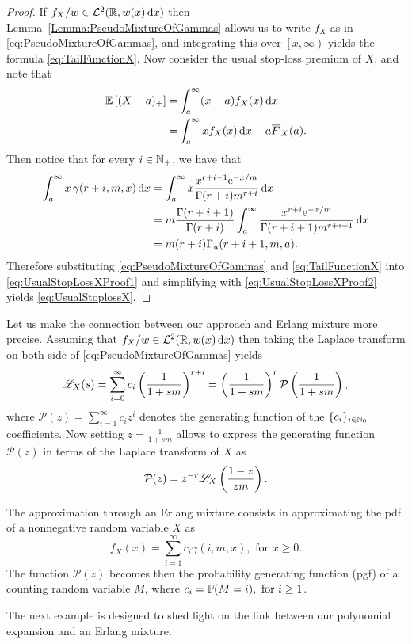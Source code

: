 \begin{proof}
If $f_{X}/w\in \mathcal{L}^2(\mathbb{R}, w(x) \mathop{}\!\mathrm{d} x)$ then Lemma~\ref{Lemma:PseudoMixtureOfGammas} allows us to write $f_X$ as in \eqref{eq:PseudoMixtureOfGammas}, and integrating this over $\left[x,\infty\right)$ yields the formula \eqref{eq:TailFunctionX}.
Now consider the usual stop-loss premium of $X$, and note that
\begin{align}
\Exp\left[(X-a)_+\right]=&\int_{a}^{\infty}(x-a)f_{X}(x)\dd x \nonumber\\
=&\int_{a}^{\infty}xf_{X}(x)\dd x-a\Ftail_{X}(a).\label{eq:UsualStopLossXProof1}
\end{align}
Then notice that for every $i \in \mathbb{N}_+$, we have that
\begin{align}
\int_{a}^{\infty} x \, \gamma(r+i, m, x)\mathop{}\!\mathrm{d} x
&= \int_{a}^{\infty}x\frac{x^{r+i-1} \mathrm{e}^{-x/m}}{\Gamma(r+i)m^{r+i}}\mathop{}\!\mathrm{d} x\nonumber\\
&= m\frac{\Gamma(r+i+1)}{\Gamma(r+i)}\int_{a}^{\infty}\frac{x^{r+i} \mathrm{e}^{-x/m}}{\Gamma(r+i+1)m^{r+i+1}}\mathop{}\!\mathrm{d} x\nonumber\\
&= m (r+i) \Gamma_{u}(r+i+1,m,a).\label{eq:UsualStopLossXProof2}
\end{align}
Therefore substituting \eqref{eq:PseudoMixtureOfGammas} and \eqref{eq:TailFunctionX} into \eqref{eq:UsualStopLossXProof1} and simplifying with \eqref{eq:UsualStopLossXProof2} yields \eqref{eq:UsualStoplossX}.

\end{proof}
Let us make the connection between our approach and Erlang mixture more precise. Assuming that $f_{X}/w\in\mathcal{L}^2(\mathbb{R}, w(x) \mathop{}\!\mathrm{d} x)$ then taking the Laplace transform on both side of \eqref{eq:PseudoMixtureOfGammas} yields
\begin{equation*}
\mathscr{L}_{X}(s)=\sum_{i=0}^{\infty} c_i \left(\frac{1}{1+sm}\right)^{r+i}
=\left(\frac{1}{1+sm}\right)^{r}\mathcal{P}\left(\frac{1}{1+sm}\right),\label{eq:PseudoErlangMixtureLaplaceTransform}
\end{equation*}
where $\mathcal{P}(z)=\sum_{i=1}^{\infty}c_i z^{i}$ denotes the generating function of the $\{c_i\}_{i\in\mathbb{N}_0}$ coefficients. Now setting $z=\frac{1}{1+sm}$ allows to express the generating function $\mathcal{P}(z)$ in terms of the Laplace transform of $X$ as
\begin{equation*}\label{eq:GeneratingFunctionPi}
\mathcal{P}(z)=z^{-r}\mathscr{L}_{X}\left(\frac{1-z}{zm}\right).
\end{equation*}

\begin{remark}
The approximation through an Erlang mixture consists in approximating the pdf of a nonnegative random variable $X$ as
\begin{equation*}\label{eq:ErlangMixtureRepresentation}
f_X(x)=\sum_{i=1}^{\infty}c_i\gamma(i,m,x),\text{ for }x\geq0.
\end{equation*}
The function $\mathcal{P}(z)$ becomes then the probability generating function (pgf) of a counting random variable $M$, where $c_i=\operatorname{{\mathbb P}}(M=i),\text{ for }i\geq1$.
\remQED
\end{remark}
The next example is designed to shed light on the link between our polynomial expansion and an Erlang mixture.

